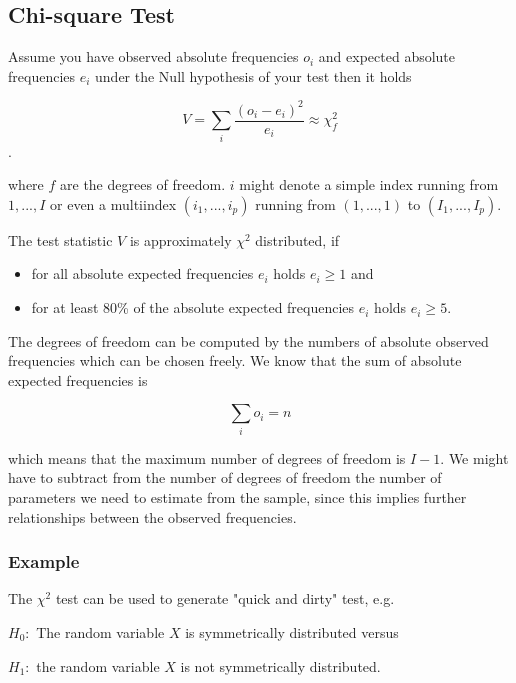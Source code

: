 \subsection{Chi-square Test} 

Assume you have observed absolute frequencies $o_i$ and expected absolute frequencies $e_i$ under the Null hypothesis of your test then it holds

\begin{equation}
  V = \sum_i \frac{(o_i-e_i)^2}{e_i} \approx \chi^2_f
\end{equation}.

where $f$ are the degrees of freedom. $i$ might denote a simple index running from $1,...,I$ or even a multiindex $(i_1,...,i_p)$ running from $(1,...,1)$ to $(I_1,...,I_p)$.

The test statistic $V$ is approximately $\chi^2$ distributed, if

\begin{itemize}
  \item for all absolute expected frequencies $e_i$ holds $e_i \geq 1$ and
  \item for at least 80\% of the absolute expected frequencies $e_i$ holds $e_i \geq 5$.
\end{itemize}

The degrees of freedom can be computed by the numbers of absolute observed frequencies which can be chosen freely. We know that the sum of absolute expected frequencies is

\begin{equation}
  \sum_i o_i = n
\end{equation}

which means that the maximum number of degrees of freedom is $I-1$. We might have to subtract from the number of degrees of freedom the number of parameters we need to estimate from the sample, since this implies further relationships between the observed frequencies.

\subsubsection{Example}

The $\chi^2$ test can be used to generate "quick and dirty" test, e.g.

$H_0:$ The random variable $X$ is symmetrically distributed versus

$H_1:$ the random variable $X$ is not symmetrically distributed.

